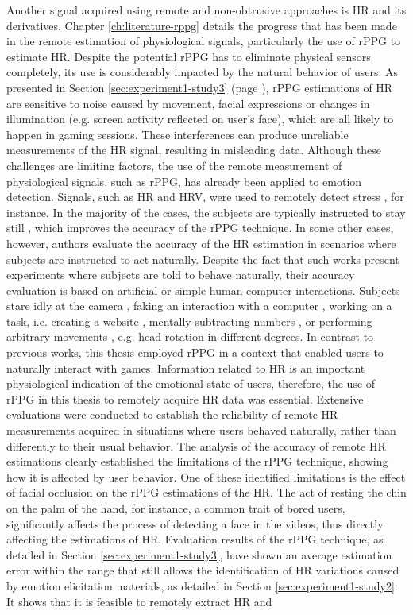 Another signal acquired using remote and non-obtrusive approaches is HR and its derivatives. Chapter \ref{ch:literature-rppg} details the progress that has been made in the remote estimation of physiological signals, particularly the use of rPPG to estimate HR. Despite the potential rPPG has to eliminate physical sensors completely, its use is considerably impacted by the natural behavior of users. As presented in Section \ref{sec:experiment1-study3} (page \pageref{sec:experiment1-study3}), rPPG estimations of HR are sensitive to noise caused by movement, facial expressions or changes in illumination (e.g. screen activity reflected on user's face), which are all likely to happen in gaming sessions. These interferences can produce unreliable measurements of the HR signal, resulting in misleading data. Although these challenges are limiting factors, the use of the remote measurement of physiological signals, such as rPPG, has already been applied to emotion detection. Signals, such as HR and HRV, were used to remotely detect stress \parencite{mcduffcogcam, mcduff2014improvements, bousefsaf2013remote}, for instance. In the majority of the cases, the subjects are typically instructed to stay still \parencite{rouast2016remote}, which improves the accuracy of the rPPG technique. In some other cases, however, authors evaluate the accuracy of the HR estimation in scenarios where subjects are instructed to act naturally. Despite the fact that such works present experiments where subjects are told to behave naturally, their accuracy evaluation is based on artificial or simple human-computer interactions. Subjects stare idly at the camera \parencite{zhao2013remote,hsu2014learning}, faking an interaction with a computer \parencite{poh2010non}, working on a task, i.e. creating a website \parencite{monkaresi2014machine}, mentally subtracting numbers \parencite{mcduff2014remote}, or performing arbitrary movements \parencite{tran2015robust}, e.g. head rotation in different degrees. In contrast to previous works, this thesis employed rPPG in a context that enabled users to naturally interact with games. Information related to HR is an important physiological indication of the emotional state of users, therefore, the use of rPPG in this thesis to remotely acquire HR data was essential. Extensive evaluations were conducted to establish the reliability of remote HR measurements acquired in situations where users behaved naturally, rather than differently to their usual behavior. The analysis of the accuracy of remote HR estimations clearly established the limitations of the rPPG technique, showing how it is affected by user behavior. One of these identified limitations is the effect of facial occlusion on the rPPG estimations of the HR. The act of resting the chin on the palm of the hand, for instance, a common trait of bored users, significantly affects the process of detecting a face in the videos, thus directly affecting the estimations of HR. Evaluation results of the rPPG technique, as detailed in Section \ref{sec:experiment1-study3}, have shown an average estimation error within the range that still allows the identification of HR variations caused by emotion elicitation materials, as detailed in Section \ref{sec:experiment1-study2}. It shows that it is feasible to remotely extract HR and 